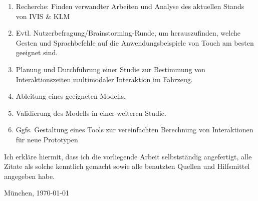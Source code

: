 \documentclass[11pt,a4paper,twoside]{book}
\begin{document}
\begin{enumerate}
\item Recherche: Finden verwandter Arbeiten und Analyse des aktuellen Stands von IVIS \& KLM 
\item Evtl. Nutzerbefragung/Brainstorming-Runde, um herauszufinden, welche Gesten und Sprachbefehle auf die Anwendungsbeispiele von Touch am besten geeignet sind. 
\item Planung und Durchführung einer Studie zur Bestimmung von Interaktionszeiten multimodaler Interaktion im Fahrzeug. 
\item Ableitung eines geeigneten Modells. 
\item Validierung des Modells in einer weiteren Studie. 
\item Ggfs. Gestaltung eines Tools zur vereinfachten Berechnung von Interaktionen für neue Prototypen 
\end{enumerate}

\vfill %

\noindent Ich erkläre hiermit, dass ich die vorliegende Arbeit
selbstständig angefertigt, alle Zitate als solche kenntlich gemacht
sowie alle benutzten Quellen und Hilfsmittel angegeben habe.

\bigskip\noindent München, \today

\vspace{4ex}\noindent\makebox[7cm]{\dotfill}

\cleardoublepage
\pagestyle{fancy}

\setlength{\parskip}{1pt}
\tableofcontents
\setlength{\parskip}{\baselineskip}


\cleardoublepage

\fancyhead[LE,RO]{\rightmark}
\fancyhead[LO,RE]{\leftmark}
\fancyfoot[LE,RO]{\thepage}













\end{document}
